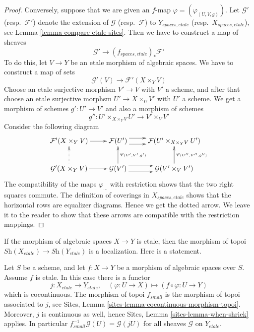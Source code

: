 \begin{proof}
\medskip\noindent
Conversely, suppose that we are given an $f$-map
$\varphi = (\varphi_{(U, V, g)})$.
Let $\mathcal{G}'$ (resp.\ $\mathcal{F}'$) denote the extension of
$\mathcal{G}$ (resp.\ $\mathcal{F}$) to $Y_{spaces, etale}$
(resp.\ $X_{spaces, etale}$), see Lemma \ref{lemma-compare-etale-sites}.
Then we have to construct a map of sheaves
$$
\mathcal{G}' \longrightarrow (f_{spaces, etale})_*\mathcal{F}'
$$
To do this, let $V \to Y$ be an etale morphism of algebraic spaces.
We have to construct a map of sets
$$
\mathcal{G}'(V) \to \mathcal{F}'(X \times_Y V)
$$
Choose an etale surjective morphism $V' \to V$ with $V'$ a scheme,
and after that choose an etale surjective morphsm
$U' \to X \times_U V'$ with $U'$ a scheme. We get a morphism of
schemes $g' : U' \to V'$ and also a morphism of schemes
$$
g'' : U' \times_{X \times_Y V} U' \longrightarrow V' \times_V V'
$$
Consider the following diagram
$$
\xymatrix{
\mathcal{F}'(X \times_Y V) \ar[r] &
\mathcal{F}(U') \ar@<1ex>[r] \ar@<-1ex>[r] &
\mathcal{F}(U' \times_{X \times_Y V} U') \\
\mathcal{G}'(X \times_Y V) \ar[r] \ar@{..>}[u] &
\mathcal{G}(V') \ar@<1ex>[r] \ar@<-1ex>[r] \ar[u]_{\varphi_{(U', V', g')}} &
\mathcal{G}(V' \times_V V') \ar[u]_{\varphi_{(U'', V'', g'')}}
}
$$
The compatibility of the maps $\varphi_{...}$
with restriction shows that the two right squares commute.
The definition of coverings in $X_{spaces, etale}$ shows that
the horizontal rows are equalizer diagrams. Hence we get
the dotted arrow. We leave it to the reader to show that these
arrows are compatible with the restriction mappings.
\end{proof}

\noindent
If the morphism of algebraic spaces $X \to Y$ is etale, then the morphism
of topoi $\textit{Sh}(X_{etale}) \to \textit{Sh}(Y_{etale})$
is a localization. Here is a statement.

\begin{lemma}
\label{lemma-etale-morphism-topoi}
Let $S$ be a scheme, and let $f : X \to Y$ be a morphism of algebraic spaces
over $S$. Assume $f$ is etale. In this case there is a functor
$$
j : X_{etale} \to Y_{etale},\quad
(\varphi : U \to X) \mapsto (f \circ \varphi : U \to Y)
$$
which is cocontinuous. The morphism of topoi $f_{small}$ is the
morphism of topoi associated to $j$, see
Sites, Lemma \ref{sites-lemma-cocontinuous-morphism-topoi}.
Moreover, $j$ is continuous as well, hence
Sites, Lemma \ref{sites-lemma-when-shriek}
applies. In particular $f_{small}^{-1}\mathcal{G}(U) = \mathcal{G}(jU)$
for all sheaves $\mathcal{G}$ on $Y_{etale}$.
\end{lemma}

